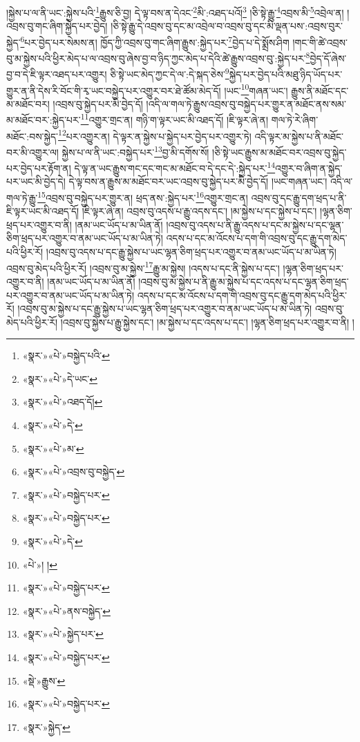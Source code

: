 །སྐྱེས་པ་ལ་ནི་ཡང་:སྐྱེས་པའི་\footnote{«སྣར་»«པེ་»བསྐྱེད་པའི་}རྒྱུས་ཅི་བྱ། དེ་ལྟ་བས་ན་དེའང་\footnote{«སྣར་»«པེ་»དེ་ཡང་}མི་:འཐད་པའོ།\footnote{«སྣར་»«པེ་»འཐད་དོ།} །ཅི་སྟེ་རྒྱུ་\footnote{«སྣར་»«པེ་»དེ་}འབྲས་མི་\footnote{«སྣར་»«པེ་»མ་}འབྲེལ་ན། །འབྲས་བུ་གང་ཞིག་སྐྱེད་པར་བྱེད། །ཅི་སྟེ་རྒྱུ་དེ་འབྲས་བུ་དང་མ་འབྲེལ་བ་འབྲས་བུ་དང་མི་ལྡན་པས་:འབྲས་བུར་སྐྱེད་\footnote{«སྣར་»«པེ་»འབྲས་བུ་བསྐྱེད་}པར་བྱེད་པར་སེམས་ན། ཁྱོད་ཀྱི་འབྲས་བུ་གང་ཞིག་རྒྱུས་:སྐྱེད་པར་\footnote{«སྣར་»«པེ་»བསྐྱེད་པར་}བྱེད་པ་དེ་སྨྲོས་ཤིག །གང་གི་ཚེ་འབྲས་བུ་མ་སྐྱེས་པའི་ཕྱིར་མེད་པ་ལ་འབྲས་བུ་ཞེས་བྱ་བ་ཉིད་ཀྱང་མེད་པ་དེའི་ཚེ་རྒྱུས་འབྲས་བུ་:སྐྱེད་པར་\footnote{«སྣར་»«པེ་»བསྐྱེད་པར་}བྱེད་དོ་ཞེས་བྱ་བ་དེ་ཇི་ལྟར་འཐད་པར་འགྱུར། ཅི་སྟེ་ཡང་མེད་ཀྱང་དེ་ལ་:དེ་སྐད་ཅེས་\footnote{«སྣར་»«པེ་»དེ་}སྐྱེད་པར་བྱེད་པའི་མཐུ་ཉིད་ཡོད་པར་གྱུར་ན་ནི་དེས་རི་བོང་གི་རྭ་ཡང་བསྐྱེད་པར་འགྱུར་བར་ཐེ་ཚོམ་མེད་དོ། །ཡང་\footnote{«པེ་»། །}གཞན་ཡང་། རྒྱུས་ནི་མཐོང་དང་མ་མཐོང་བར། །འབྲས་བུ་སྐྱེད་པར་མི་བྱེད་དོ། །འདི་ལ་གལ་ཏེ་རྒྱུས་འབྲས་བུ་བསྐྱེད་པར་གྱུར་ན་མཐོང་ནས་སམ་མ་མཐོང་བར་:སྐྱེད་པར་\footnote{«སྣར་»«པེ་»བསྐྱེད་པར་}འགྱུར་གྲང་ན། གཉི་ག་ལྟར་ཡང་མི་འཐད་དོ། །ཇི་ལྟར་ཞེ་ན། གལ་ཏེ་རེ་ཞིག་མཐོང་:བས་སྐྱེད་\footnote{«སྣར་»«པེ་»ནས་བསྐྱེད་}པར་འགྱུར་ན། དེ་ལྟར་ན་སྐྱེས་པ་སྐྱེད་པར་བྱེད་པར་འགྱུར་ཏེ། འདི་ལྟར་མ་སྐྱེས་པ་ནི་མཐོང་བར་མི་འགྱུར་ལ། སྐྱེས་པ་ལ་ནི་ཡང་:བསྐྱེད་པར་\footnote{«སྣར་»«པེ་»སྐྱེད་པར་}བྱ་མི་དགོས་སོ། །ཅི་སྟེ་ཡང་རྒྱུས་མ་མཐོང་བར་འབྲས་བུ་སྐྱེད་པར་བྱེད་པར་རྟོག་ན། དེ་ལྟ་ན་ཡང་རྒྱུས་གང་དང་གང་མ་མཐོང་བ་དེ་དང་དེ་:སྐྱེད་པར་\footnote{«སྣར་»«པེ་»བསྐྱེད་པར་}འགྱུར་བ་ཞིག་ན་སྐྱེད་པར་ཡང་མི་བྱེད་དེ། དེ་ལྟ་བས་ན་རྒྱུས་མ་མཐོང་བར་ཡང་འབྲས་བུ་སྐྱེད་པར་མི་བྱེད་དོ། །ཡང་གཞན་ཡང་། འདི་ལ་གལ་ཏེ་རྒྱུ་\footnote{«སྡེ་»རྒྱུས་}འབྲས་བུ་བསྐྱེད་པར་གྱུར་ན། ཕྲད་ནས་:སྐྱེད་པར་\footnote{«སྣར་»«པེ་»བསྐྱེད་པར་}འགྱུར་གྲང་ན། འབྲས་བུ་དང་རྒྱུ་དག་ཕྲད་པ་ནི་ཇི་ལྟར་ཡང་མི་འཐད་དོ། །ཇི་ལྟར་ཞེ་ན། འབྲས་བུ་འདས་པ་རྒྱུ་འདས་དང་། །མ་སྐྱེས་པ་དང་སྐྱེས་པ་དང་། །ལྷན་ཅིག་ཕྲད་པར་འགྱུར་བ་ནི། །ནམ་ཡང་ཡོད་པ་མ་ཡིན་ནོ། །འབྲས་བུ་འདས་པ་ནི་རྒྱུ་འདས་པ་དང་མ་སྐྱེས་པ་དང་ལྷན་ཅིག་ཕྲད་པར་འགྱུར་བ་ནམ་ཡང་ཡོད་པ་མ་ཡིན་ཏེ། འདས་པ་དང་མ་འོངས་པ་དག་གི་འབྲས་བུ་དང་རྒྱུ་དག་མེད་པའི་ཕྱིར་རོ། །འབྲས་བུ་འདས་པ་དང་རྒྱུ་སྐྱེས་པ་ཡང་ལྷན་ཅིག་ཕྲད་པར་འགྱུར་བ་ནམ་ཡང་ཡོད་པ་མ་ཡིན་ཏེ། འབྲས་བུ་མེད་པའི་ཕྱིར་རོ། །འབྲས་བུ་མ་སྐྱེས་\footnote{«སྣར་»སྐྱེད་}རྒྱུ་མ་སྐྱེས། །འདས་པ་དང་ནི་སྐྱེས་པ་དང་། །ལྷན་ཅིག་ཕྲད་པར་འགྱུར་བ་ནི། །ནམ་ཡང་ཡོད་པ་མ་ཡིན་ནོ། །འབྲས་བུ་མ་སྐྱེས་པ་ནི་རྒྱུ་མ་སྐྱེས་པ་དང་འདས་པ་དང་ལྷན་ཅིག་ཕྲད་པར་འགྱུར་བ་ནམ་ཡང་ཡོད་པ་མ་ཡིན་ཏེ། འདས་པ་དང་མ་འོངས་པ་དག་གི་འབྲས་བུ་དང་རྒྱུ་དག་མེད་པའི་ཕྱིར་རོ། །འབྲས་བུ་མ་སྐྱེས་པ་དང་རྒྱུ་སྐྱེས་པ་ཡང་ལྷན་ཅིག་ཕྲད་པར་འགྱུར་བ་ནམ་ཡང་ཡོད་པ་མ་ཡིན་ཏེ། འབྲས་བུ་མེད་པའི་ཕྱིར་རོ། །འབྲས་བུ་སྐྱེས་པ་རྒྱུ་སྐྱེས་དང་། །མ་སྐྱེས་པ་དང་འདས་པ་དང་། །ལྷན་ཅིག་ཕྲད་པར་འགྱུར་བ་ནི། །
